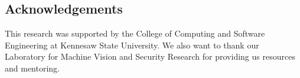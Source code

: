 \documentclass[a4paper, 10pt]{article}
\begin{document}

\subsection*{Acknowledgements}
This research was supported by the College of Computing and Software Engineering
at Kennesaw State University. We also want to thank our Laboratory for Machine
Vision and Security Research for providing us resources and mentoring.

\vspace{5mm}



\end{document}
